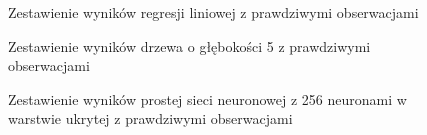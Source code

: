 \documentclass[10pt,a4paper]{article}
\begin{document}
\begin{figure}[!ht]
	\centering
	\caption{Zestawienie wyników regresji liniowej z prawdziwymi obserwacjami}
	\label{figure:linear_comparison}
\end{figure}
\FloatBarrier
\begin{figure}[!ht]
	\centering
	\caption{Zestawienie wyników drzewa o głębokości 5 z prawdziwymi obserwacjami}
	\label{figure:tree_comparison}
\end{figure}
\FloatBarrier
\begin{figure}[!ht]
	\centering
	\caption{Zestawienie wyników prostej sieci neuronowej z 256 neuronami w warstwie ukrytej z prawdziwymi obserwacjami}
	\label{figure:simple_rnn_comparison}
\end{figure}
\end{document}
